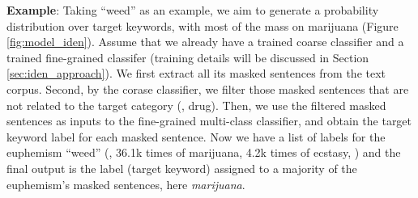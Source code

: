 \noindent \textbf{Example}: 
Taking ``weed'' as an example, we aim to generate a probability distribution over target keywords, with most of the mass on marijuana (Figure \ref{fig:model_iden}). 
Assume that we already have a trained coarse classifier and a trained fine-grained classifer (training details will be discussed in Section \ref{sec:iden_approach}). 
We first extract all its masked sentences from the text corpus. 
Second, by the corase classifier, we filter those masked sentences that are not related to the target category (\ie, drug). 
Then, we use the filtered masked sentences as inputs to the fine-grained multi-class classifier, and obtain the target keyword label for each masked sentence. 
Now we have a list of labels for the euphemism ``weed'' (\eg, 36.1k times of marijuana, 4.2k times of ecstasy, \etc) and the final output is the label (target keyword) assigned to a majority of the euphemism's masked sentences, here \textit{marijuana}. %








